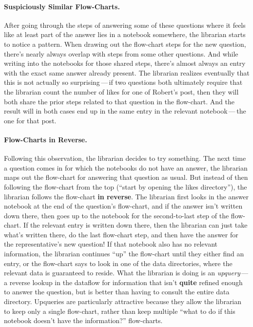 \paragraph{Suspiciously Similar Flow-Charts.}
%
After going through the steps of answering some of these questions where it
feels like at least part of the answer lies in a notebook somewhere, the
librarian starts to notice a pattern. When drawing out the flow-chart steps for
the new question, there's nearly always overlap with steps from some other
questions. And while writing into the notebooks for those shared steps, there's
almost always an entry with the exact same answer already present. The librarian
realizes eventually that this is not actually so surprising\,---\,if two
questions both ultimately require that the librarian count the number of likes
for one of Robert's post, then they will both share the prior steps related to
that question in the flow-chart. And the result will in both cases end up in the
same entry in the relevant notebook\,---\,the one for that post.

\paragraph{Flow-Charts in Reverse.}
%
Following this observation, the librarian decides to try something. The next
time a question comes in for which the notebooks do not have an answer, the
librarian maps out the flow-chart for answering that question as usual. But
instead of then following the flow-chart from the top (``start by opening the
likes directory''), the librarian follows the flow-chart \textbf{in reverse}.
The librarian first looks in the answer notebook at the end of the question's
flow-chart, and if the answer isn't written down there, then goes up to the
notebook for the second-to-last step of the flow-chart. If the relevant entry is
written down there, then the librarian can just take what's written there, do
the last flow-chart step, and then have the answer for the representative's new
question! If that notebook also has no relevant information, the librarian
continues ``up'' the flow-chart until they either find an entry, or the
flow-chart says to look in one of the data directories, where the relevant data
is guaranteed to reside. What the librarian is doing is an
\textit{upquery}\,---\,a reverse lookup in the dataflow for information that
isn't \textbf{quite} refined enough to answer the question, but is better than
having to consult the entire data directory. Upqueries are particularly
attractive because they allow the librarian to keep only a single flow-chart,
rather than keep multiple ``what to do if this notebook doesn't have the
information?'' flow-charts.

